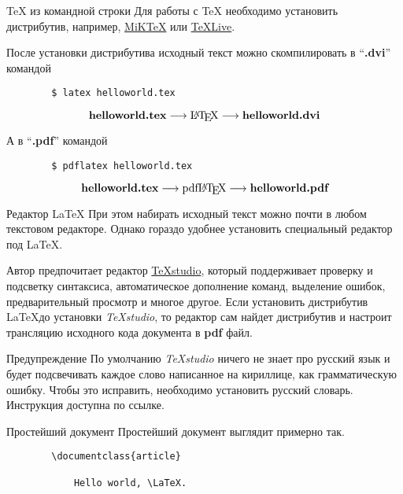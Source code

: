 \begin{frame}[fragile]{\TeX{} из командной строки}
	Для работы с \TeX{} необходимо установить дистрибутив, например, \href{https://miktex.org/}{MiKTeX} или \href{https://www.tug.org/texlive/}{TeXLive}. 
	
	После установки дистрибутива исходный текст можно скомпилировать в ``\textbf{.dvi}'' командой
	
	\large
	\begin{verbatim}
		$ latex helloworld.tex
	\end{verbatim}
	
	\[
		\textbf{helloworld.tex} \longrightarrow \text{\LaTeX} \longrightarrow \textbf{helloworld.dvi}
	\]
	
	А в ``\textbf{.pdf}'' командой
	
	\begin{verbatim}
		$ pdflatex helloworld.tex
	\end{verbatim}
	
	\[
	\textbf{helloworld.tex} \longrightarrow \text{pdf\LaTeX} \longrightarrow \textbf{helloworld.pdf}
	\]
\end{frame}

\begin{frame}[fragile]{Редактор \LaTeX{}}
	При этом набирать исходный текст можно почти в любом текстовом редакторе. Однако гораздо удобнее установить специальный редактор под \LaTeX. 
	
	Автор предпочитает редактор \href{https://www.texstudio.org/}{TeXstudio}, который поддерживает проверку и подсветку синтаксиса, автоматическое дополнение команд, выделение ошибок, предварительный просмотр и многое другое. Если установить дистрибутив \LaTeX до установки \textit{TeXstudio}, то редактор сам найдет дистрибутив и настроит трансляцию исходного кода документа в \textbf{pdf} файл.
	
	\begin{alertblock}{Предупреждение}
		По умолчанию \textit{TeXstudio} ничего не знает про русский язык и будет подсвечивать каждое слово написанное на кириллице, как грамматическую ошибку. Чтобы это исправить, необходимо установить русский словарь. Инструкция доступна по ссылке. 
	\end{alertblock}
\end{frame}


\begin{frame}[fragile]{Простейший документ}
	Простейший документ выглядит примерно так.
	\begin{verbatim}
		\documentclass{article}
		
			Hello world, \LaTeX.
		
	\end{verbatim}

\end{frame}

